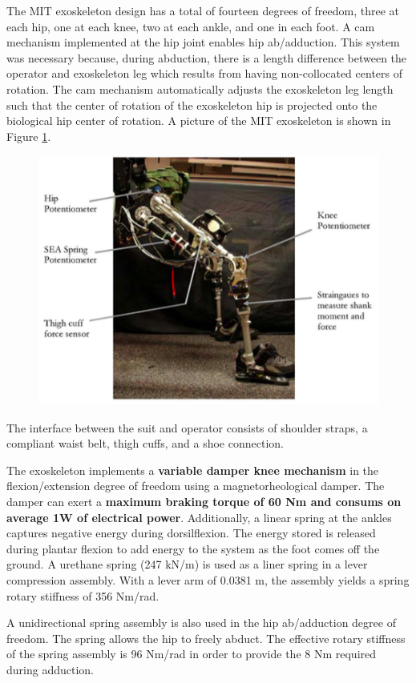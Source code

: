  The MIT exoskeleton design has a total of fourteen degrees of freedom, three at each hip, one at each knee, two at each ankle, and one in each foot.  A cam mechanism implemented at the hip joint enables hip ab/adduction.  This system was necessary because, during abduction, there is a length difference between the operator and exoskeleton leg which results from having non-collocated centers of rotation.  The cam mechanism automatically adjusts the exoskeleton leg length such that the center of rotation of the exoskeleton hip is projected onto the biological hip center of rotation.  A picture of the MIT exoskeleton is shown in Figure \ref{fig:MITsuit}.
 \begin{figure}[thpb]
\centering
\includegraphics[width=3.in]{exos/figs/MIT/MITsuit}
  \caption{}
 \label{fig:MITsuit}   
 \end{figure} 
% 
 The interface between the suit and operator consists of shoulder straps, a compliant waist belt, thigh cuffs, and a shoe connection.  

 The exoskeleton implements a {\bf variable damper knee mechanism} in the flexion/extension degree of freedom using a magnetorheological damper.  The damper can exert a {\bf maximum braking torque of 60 Nm and consums on average 1W of electrical power}.  Additionally, a linear spring at the ankles captures negative energy during dorsilflexion.  The energy stored is released during plantar flexion to add energy to the system as the foot comes off the ground. A urethane spring (247 kN/m) is used as a liner spring in a lever compression assembly.  With a lever arm of 0.0381 m, the assembly yields a spring rotary stiffness of 356 Nm/rad. 
 
 A unidirectional spring assembly is also used in the hip ab/adduction degree of freedom.  The spring allows the hip to freely abduct.  The effective rotary stiffness of the spring assembly is 96 Nm/rad in order to provide the 8 Nm required during adduction.

